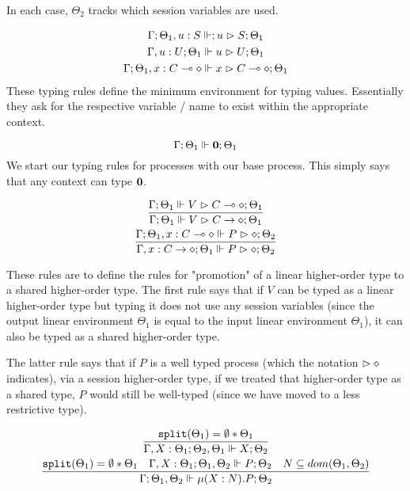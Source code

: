 In each case, $\Theta_2$ tracks which session variables are used.

\begin{gather*}
\Gamma ; \Theta_1, u:S \Vdash ; u \vartriangleright S ; \Theta_1 \\
\Gamma, u : U ; \Theta_1 \Vdash u \vartriangleright U ; \Theta_1 \\
\Gamma ; \Theta_1 , x : C \multimap \diamond \Vdash x \vartriangleright C \multimap \diamond ; \Theta_1
\end{gather*}
These typing rules define the minimum environment for typing values. Essentially they ask for the respective variable / name to exist within the appropriate context.


$$
\Gamma ; \Theta_1 \Vdash \textbf{0} ; \Theta_1
$$
We start our typing rules for processes with our base process. This simply says that any context can type $\textbf{0}$.

\begin{gather*}
\frac{\Gamma ; \Theta_1 \Vdash V \vartriangleright C \multimap \diamond ; \Theta_1}{\Gamma ; \Theta_1 \Vdash V \vartriangleright C \rightarrow \diamond ; \Theta_1} \\
\frac{\Gamma ; \Theta_1, x : C \multimap \diamond \Vdash P \vartriangleright \diamond ; \Theta_2}{\Gamma, x : C \rightarrow \diamond ; \Theta_1 \Vdash P \vartriangleright \diamond ; \Theta_2}
\end{gather*}

These rules are to define the rules for "promotion" of a linear higher-order type to a shared higher-order type. The first rule says that if $V$ can be typed as a linear higher-order type but typing it does not use any session variables (since the output linear environment $\Theta_1$ is equal to the input linear environment $\Theta_1$), it can also be typed as a shared higher-order type.

The latter rule says that if $P$ is a well typed process (which the notation $\vartriangleright \diamond$ indicates), via a session higher-order type, if we treated that higher-order type as a shared type, $P$ would still be well-typed (since we have moved to a less restrictive type).


\begin{gather*}
\frac{\texttt{split}(\Theta_1) = \emptyset * \Theta_1}{\Gamma , X : \Theta_1 ; \Theta_2, \Theta_1 \Vdash X ; \Theta_2}\\
\frac{\texttt{split}(\Theta_1) = \emptyset * \Theta_1 \quad \Gamma , X : \Theta_1 ; \Theta_1, \Theta_2 \Vdash P ; \Theta_2 \quad N \subseteq dom(\Theta_1, \Theta_2)}{\Gamma ; \Theta_1, \Theta_2 \Vdash \mu(X : N) . P ; \Theta_2}
\end{gather*}

